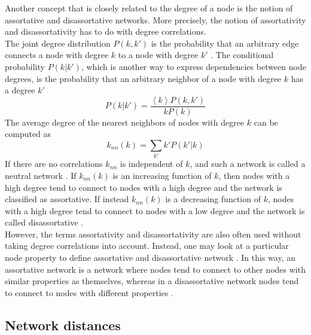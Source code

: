 \documentclass[11 pt , letterpaper , twoside , openright]{book}
\begin{document}
Another concept that is closely related to the degree of a node is the notion of assortative and disassortative networks. More precisely, the notion of assortativity and disassortativity has to do with degree correlations. \\
The joint degree distribution $P(k, k')$ is the probability that an arbitrary edge connects a node with degree $k$ to a node with degree $k'$ \cite{F.Costa2007}. The conditional probability $P(k|k')$, which is another way to express dependencies between node degrees, is the probability that an arbitrary neighbor of a node with degree $k$ has a degree $k'$ \cite{F.Costa2007}
\begin{equation}
	P(k|k') = \frac{\left<k\right>P(k, k')}{kP(k)}
\end{equation}
The average degree of the nearest neighbors of nodes with degree $k$ can be computed as \cite{F.Costa2007}
\begin{equation}
	k_{nn}(k) = \sum_{k'} k'P(k'|k)
\end{equation}
If there are no correlations $k_{nn}$ is independent of $k$, and such a network is called a neutral network \cite{F.Costa2007}. If $k_{nn}(k)$ is an increasing function of $k$, then nodes with a high degree tend to connect to nodes with a high degree and the network is classified as assortative. If instead $k_{nn}(k)$ is a decreasing function of $k$, nodes with a high degree tend to connect to nodes with a low degree and the network is called disassortative \cite{F.Costa2007}.\\
However, the terms assortativity and disassortativity are also often used without taking degree correlations into account. Instead, one may look at a particular node property to define assortative and disassortative network \cite{Thed2014}. In this way, an assortative network is a network where nodes tend to connect to other nodes with similar properties as themselves, whereas in a disassortative network nodes tend to connect to nodes with different properties \cite{Thed2014}.



\subsection{Network distances}
\end{document}
